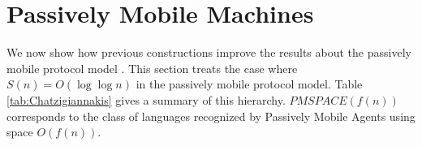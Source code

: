 \documentclass[UKenglish]{llncs}
\begin{document}
\section{Passively Mobile Machines}
\label{sec:4demi}


We now show how previous constructions
 improve the results about the passively mobile protocol model  \cite{chatzigiannakis2011passively}.
This section treats the case where $S(n)=O(\log\log n)$ in the
passively mobile protocol model. Table \ref{tab:Chatzigiannakis} gives a summary of this hierarchy.
$PMSPACE(f(n))$ corresponds to the class of languages recognized
by Passively Mobile Agents using space $O(f(n))$.
\end{document}
